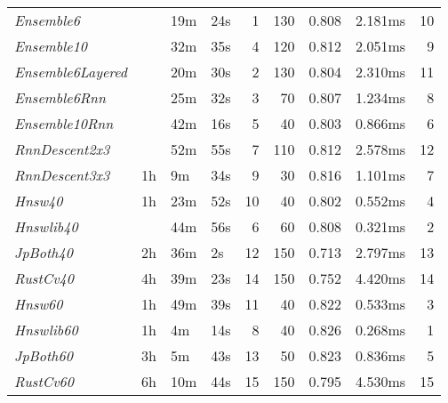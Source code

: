 \begin{tabular}{llllrrrlr}
\toprule
\midrule
\emph{Ensemble6} &  & 19m & 24s & 1 & 130 & 0.808 & 2.181ms & 10 \\
\emph{Ensemble10} &  & 32m & 35s & 4 & 120 & 0.812 & 2.051ms & 9 \\
\emph{Ensemble6Layered} &  & 20m & 30s & 2 & 130 & 0.804 & 2.310ms & 11 \\
\emph{Ensemble6Rnn} &  & 25m & 32s & 3 & 70 & 0.807 & 1.234ms & 8 \\
\emph{Ensemble10Rnn} &  & 42m & 16s & 5 & 40 & 0.803 & 0.866ms & 6 \\
\emph{RnnDescent2x3} &  & 52m & 55s & 7 & 110 & 0.812 & 2.578ms & 12 \\
\emph{RnnDescent3x3} & 1h & 9m & 34s & 9 & 30 & 0.816 & 1.101ms & 7 \\
\emph{Hnsw40} & 1h & 23m & 52s & 10 & 40 & 0.802 & 0.552ms & 4 \\
\emph{Hnswlib40} &  & 44m & 56s & 6 & 60 & 0.808 & 0.321ms & 2 \\
\emph{JpBoth40} & 2h & 36m & 2s & 12 & 150 & 0.713 & 2.797ms & 13 \\
\emph{RustCv40} & 4h & 39m & 23s & 14 & 150 & 0.752 & 4.420ms & 14 \\
\emph{Hnsw60} & 1h & 49m & 39s & 11 & 40 & 0.822 & 0.533ms & 3 \\
\emph{Hnswlib60} & 1h & 4m & 14s & 8 & 40 & 0.826 & 0.268ms & 1 \\
\emph{JpBoth60} & 3h & 5m & 43s & 13 & 50 & 0.823 & 0.836ms & 5 \\
\emph{RustCv60} & 6h & 10m & 44s & 15 & 150 & 0.795 & 4.530ms & 15 \\
\bottomrule
\end{tabular}
